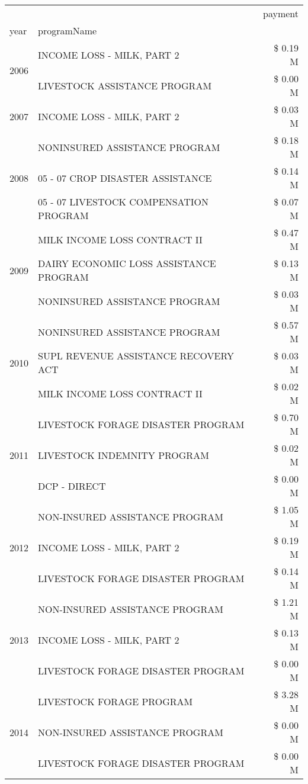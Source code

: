 \begin{tabular}{llr}
\toprule
 &  & payment \\
year & programName &  \\
\midrule
\multirow[t]{2}{*}{2006} & INCOME LOSS - MILK, PART 2 & \$ 0.19 M \\
 & LIVESTOCK ASSISTANCE PROGRAM & \$ 0.00 M \\
\cline{1-3}
2007 & INCOME LOSS - MILK, PART 2 & \$ 0.03 M \\
\cline{1-3}
\multirow[t]{3}{*}{2008} & NONINSURED ASSISTANCE PROGRAM & \$ 0.18 M \\
 & 05 - 07 CROP DISASTER ASSISTANCE & \$ 0.14 M \\
 & 05 - 07 LIVESTOCK COMPENSATION PROGRAM & \$ 0.07 M \\
\cline{1-3}
\multirow[t]{3}{*}{2009} & MILK INCOME LOSS CONTRACT II & \$ 0.47 M \\
 & DAIRY ECONOMIC LOSS ASSISTANCE PROGRAM & \$ 0.13 M \\
 & NONINSURED ASSISTANCE PROGRAM & \$ 0.03 M \\
\cline{1-3}
\multirow[t]{3}{*}{2010} & NONINSURED ASSISTANCE PROGRAM & \$ 0.57 M \\
 & SUPL REVENUE ASSISTANCE RECOVERY ACT & \$ 0.03 M \\
 & MILK INCOME LOSS CONTRACT II & \$ 0.02 M \\
\cline{1-3}
\multirow[t]{3}{*}{2011} & LIVESTOCK FORAGE DISASTER PROGRAM & \$ 0.70 M \\
 & LIVESTOCK INDEMNITY PROGRAM & \$ 0.02 M \\
 & DCP - DIRECT & \$ 0.00 M \\
\cline{1-3}
\multirow[t]{3}{*}{2012} & NON-INSURED ASSISTANCE PROGRAM & \$ 1.05 M \\
 & INCOME LOSS - MILK, PART 2 & \$ 0.19 M \\
 & LIVESTOCK FORAGE DISASTER PROGRAM & \$ 0.14 M \\
\cline{1-3}
\multirow[t]{3}{*}{2013} & NON-INSURED ASSISTANCE PROGRAM & \$ 1.21 M \\
 & INCOME LOSS - MILK, PART 2 & \$ 0.13 M \\
 & LIVESTOCK FORAGE DISASTER PROGRAM & \$ 0.00 M \\
\cline{1-3}
\multirow[t]{3}{*}{2014} & LIVESTOCK FORAGE PROGRAM & \$ 3.28 M \\
 & NON-INSURED ASSISTANCE PROGRAM & \$ 0.00 M \\
 & LIVESTOCK FORAGE DISASTER PROGRAM & \$ 0.00 M \\

\end{tabular}
